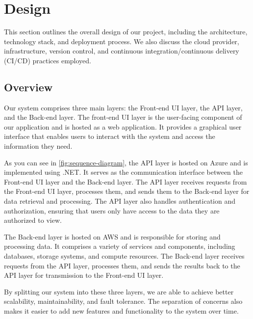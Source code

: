 \section{Design}

This section outlines the overall design of our project, including the architecture, technology stack, and deployment process. We also discuss the cloud provider, infrastructure, version control, and continuous integration/continuous delivery (CI/CD) practices employed.

\subsection{Overview}

Our system comprises three main layers: the Front-end UI layer, the API layer, and the Back-end layer. The front-end UI layer is the user-facing component of our application and is hosted as a web application. It provides a graphical user interface that enables users to interact with the system and access the information they need.

As you can see in \autoref{fig:sequence-diagram}, the API layer is hosted on Azure and is implemented using .NET. It serves as the communication interface between the Front-end UI layer and the Back-end layer. The API layer receives requests from the Front-end UI layer, processes them, and sends them to the Back-end layer for data retrieval and processing. The API layer also handles authentication and authorization, ensuring that users only have access to the data they are authorized to view.

The Back-end layer is hosted on AWS and is responsible for storing and processing data. It comprises a variety of services and components, including databases, storage systems, and compute resources. The Back-end layer receives requests from the API layer, processes them, and sends the results back to the API layer for transmission to the Front-end UI layer.

By splitting our system into these three layers, we are able to achieve better scalability, maintainability, and fault tolerance. The separation of concerns also makes it easier to add new features and functionality to the system over time.

